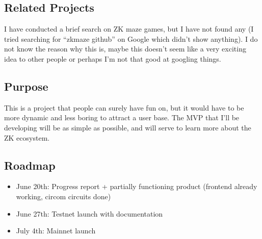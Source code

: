 \documentclass{article}
\begin{document}
\subsection*{Related Projects}
I have conducted a brief search on ZK maze games, but I have not found any (I tried searching for ``zkmaze github'' on Google which didn't show anything). I do not know the reason why this is, maybe this doesn't seem like a very exciting idea to other people or perhaps I'm not that good at googling things.

\subsection*{Purpose}
This is a project that people can surely have fun on, but it would have to be more dynamic and less boring to attract a user base. The MVP that I'll be developing will be as simple as possible, and will serve to learn more about the ZK ecosystem.

\subsection*{Roadmap}
\begin{itemize}
    \item June 20th: Progress report + partially functioning product (frontend already working, circom circuits done)
    \item June 27th: Testnet launch with documentation
    \item July 4th: Mainnet launch
\end{itemize}
\end{document}
